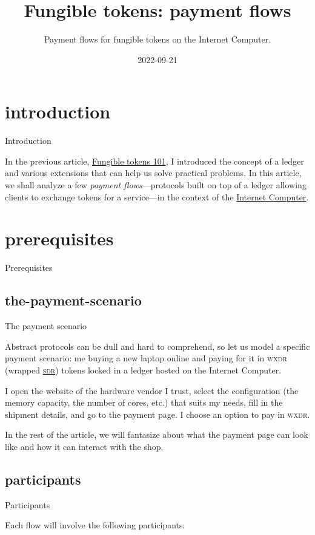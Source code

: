 \documentclass{article}
\title{Fungible tokens: payment flows}
\subtitle{Payment flows for fungible tokens on the Internet Computer.}
\date{2022-09-21}
\begin{document}
\section{introduction}{Introduction}

In the previous article, \href{/posts/09-fungible-tokens-101.html}{Fungible tokens 101}, I introduced the concept of a ledger and various extensions that can help us solve practical problems.
In this article, we shall analyze a few \emph{payment flows}---protocols built on top of a ledger allowing clients to exchange tokens for a service---in the context of the \href{https://internetcomputer.org}{Internet Computer}.

\section{prerequisites}{Prerequisites}
\subsection{the-payment-scenario}{The payment scenario}

Abstract protocols can be dull and hard to comprehend, so let us model a specific payment scenario: me buying a new laptop online and paying for it in \textsc{wxdr} (wrapped \href{https://en.wikipedia.org/wiki/Special_drawing_rights}{\textsc{sdr}}) tokens locked in a ledger hosted on the Internet Computer.

I open the website of the hardware vendor I trust, select the configuration (the memory capacity, the number of cores, etc.) that suits my needs, fill in the shipment details, and go to the payment page.
I choose an option to pay in \textsc{wxdr}.

In the rest of the article, we will fantasize about what the payment page can look like and how it can interact with the shop.

\subsection{participants}{Participants}

Each flow will involve the following participants:
\end{document}

